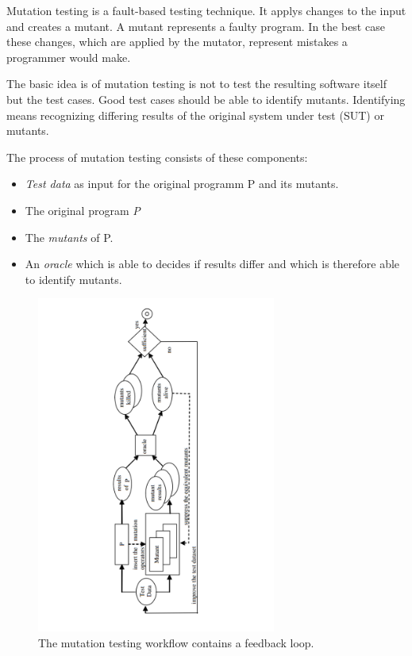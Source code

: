 \documentclass{llncs}
\begin{document}
Mutation testing is a fault-based testing technique. It applys changes to the input and creates a mutant. A mutant represents a faulty program. In the best case these changes, which are applied by the mutator, represent mistakes a programmer would make.\cite{mutationssurvey:yue}

The basic idea is of mutation testing is not to test the resulting software itself but the test cases. Good test cases should be able to identify mutants. Identifying means recognizing differing results of the original system under test (SUT) or mutants.\cite{MatMottu2006}

The process of mutation testing consists of these components:
\begin{itemize}
	\item \textit{Test data} as input for the original programm P and its mutants.
	\item The original program \textit{P}
	\item The \textit{mutants} of P.
	\item An \textit{oracle} which is able to decides if results differ and which is therefore able to identify mutants.
\end{itemize}

\begin{figure}
	\centering
	\includegraphics[width=0.7\textwidth]{figures/Mutation_Process}
	\caption{The mutation testing workflow contains a feedback loop.\cite{MatMottu2006}}
	\label{fig:Mutation_Process}
\end{figure}
\end{document}
